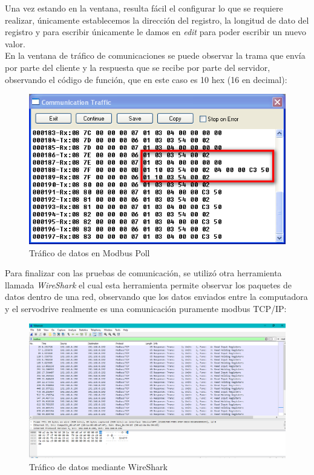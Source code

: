 \documentclass[12pt,titlepage]{article}
\begin{document}
Una vez estando en la ventana, resulta fácil el configurar lo que se requiere realizar, únicamente establecemos la dirección del registro, la longitud de dato del registro y para escribir únicamente le damos en \textit{edit} para poder escribir un nuevo valor. \\ 

En la ventana de tráfico de comunicaciones se puede observar la trama que envía por parte del cliente y la respuesta que se recibe por parte del servidor, observando el código de función, que en este caso es 10 hex (16 en decimal): \\ 
 \begin{figure}[htbp]
\hspace*{2.8cm} 
\includegraphics[scale=0.88]{poll3}
\caption{Tráfico de datos en Modbus Poll}
\end{figure}
\newpage
Para finalizar con las pruebas de comunicación, se utilizó otra herramienta llamada \textit{WireShark} el cual esta herramienta permite observar los paquetes de datos dentro de una red, observando que los datos enviados entre la computadora y el servodrive realmente es una comunicación puramente modbus TCP/IP: \\ 

 \begin{figure}[htbp]
\hspace*{0.2cm} 
\includegraphics[scale=0.50]{Response33}
\caption{Tráfico de datos mediante WireShark}
\end{figure}
\end{document}
